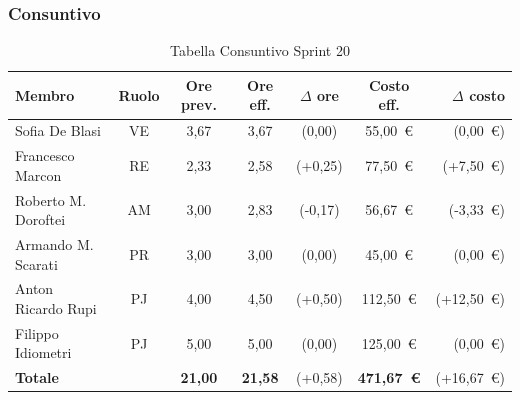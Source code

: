 \subsubsection{Consuntivo}
\begin{table}[H]
    \centering
    \renewcommand{\arraystretch}{1.3}
    \begin{tabularx}{\textwidth}{|X|c|c|c|c|c|r|}
        \hline
        \textbf{Membro} & \textbf{Ruolo} & \textbf{Ore prev.} &
        \textbf{Ore eff.} & \textbf{$\Delta$ ore} &
        \textbf{Costo eff.} & \textbf{$\Delta$ costo} \\
        \hline
        Sofia De Blasi       & VE & 3,67 & 3,67 & {\color{green}(0,00)}  & 55{,}00~\euro & {\color{green}(0{,}00~\euro)} \\
        Francesco Marcon     & RE & 2,33 & 2,58 & {\color{red}(+0,25)}   & 77{,}50~\euro & {\color{red}(+7{,}50~\euro)} \\
        Roberto M. Doroftei  & AM & 3,00 & 2,83 & {\color{green}(-0,17)} & 56{,}67~\euro & {\color{green}(-3{,}33~\euro)} \\
        Armando M. Scarati   & PR & 3,00 & 3,00 & {\color{green}(0,00)}  & 45{,}00~\euro & {\color{green}(0{,}00~\euro)} \\
        Anton Ricardo Rupi   & PJ & 4,00 & 4,50 & {\color{red}(+0,50)}   & 112{,}50~\euro & {\color{red}(+12{,}50~\euro)} \\
        Filippo Idiometri    & PJ & 5,00 & 5,00 & {\color{green}(0,00)}  & 125{,}00~\euro & {\color{green}(0{,}00~\euro)} \\
        \hline
        \textbf{Totale} & & \textbf{21,00} & \textbf{21,58} & {\color{red}(+0,58)} & \textbf{471{,}67~\euro} & {\color{red}(+16{,}67~\euro)} \\
        \hline
    \end{tabularx}
    \caption{Tabella Consuntivo Sprint 20}
\end{table}

